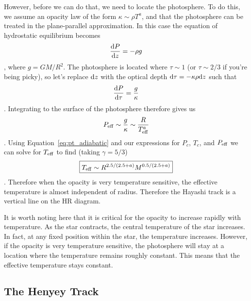However, before we can do that, we need to locate the photosphere.  To do this, we
assume an opacity law of the form $\kappa \sim \rho T^a$, and that the photosphere
can be treated in the plane-parallel approximation.
In this case the equation of hydrostatic equilibrium becomes
\begin{dmath*}
\frac{\d P}{\d z} = -\rho g
\end{dmath*},
where $g = GM/R^2$.  The photosphere is located where $\tau\sim 1$ (or $\tau\sim 2/3$ if
you're being picky), so let's replace ${\rm d} z$ with the optical depth ${\rm d}\tau = -\kappa\rho{\rm d} z$
such that
\begin{dmath*}
\frac{\d P}{\d\tau} = \frac{g}{\kappa}
\end{dmath*}.
Integrating to the surface of the photosphere therefore gives us
\begin{dmath}
    P_{\rm eff} \sim \frac{g}{\kappa} \nolinebreak
                \sim \frac{R}{T_{\rm eff}^a}
\end{dmath}.
Using Equation~\ref{eq:pt_adiabatic} and our expressions for $P_c$, $T_c$, and $P_{\rm eff}$
we can solve for $T_{\rm eff}$ to find (taking $\gamma=5/3$)
\begin{dmath}\boxed{
    T_{\rm eff} \sim R^{2.5/(2.5+a)}M^{0.5/(2.5+a)}
}\end{dmath}.
Therefore when the opacity is very temperature sensitive, the effective temperature is almost independent of radius.  Therefore the Hayashi
track is a vertical line on the HR diagram.

It is worth noting here that it is critical for the opacity to increase rapidly with temperature.
As the star contracts, the central temperature of the star increases.  In fact, at any fixed
position within the star, the temperature increases.  However, if the opacity is very temperature
sensitive, the photosphere will stay at a location where the temperature remains roughly
constant.  This means that the effective temperature stays constant.

\subsection{The Henyey Track}

